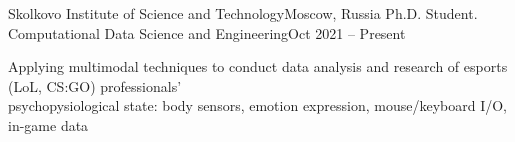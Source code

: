 
    \resumeSubheading
    {Skolkovo Institute of Science and Technology}{Moscow, Russia}
    {Ph.D. Student. Computational Data Science and Engineering}{Oct 2021 -- Present}
    \begin{itemize}[leftmargin=0in, label={}]
        \small{\item{
            {Applying multimodal techniques to conduct data analysis and research of esports (LoL, CS:GO) professionals' }\\
            {psychopysiological state: body sensors, emotion expression, mouse/keyboard I/O, in-game data}
        }}
        \end{itemize}